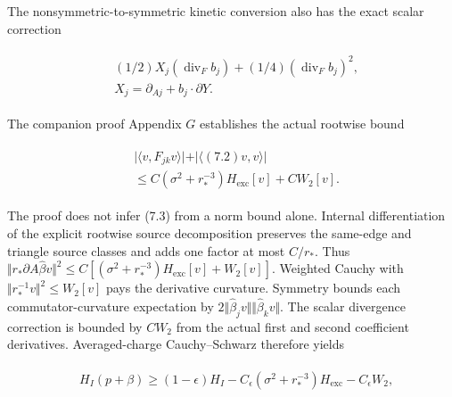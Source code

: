The nonsymmetric-to-symmetric kinetic conversion also has the exact
scalar correction

\begin{gather*}
\begin{aligned}
& (1/2)X_{j}(\operatorname{div} _{F} b_{j})+(1/4)(\operatorname{div} _{F} b_{j})^{2}, \\
& X_{j}= \partial  _{Aj}+b_{j} \cdot  \partial  Y.
\end{aligned}\tag{7.2}
\end{gather*}

The companion proof Appendix \(G\) establishes the actual rootwise bound

\begin{gather*}
\begin{aligned}
& \vert \langle v,F_{jk} v\rangle \vert +\vert \langle (7.2)v,v\rangle \vert \\
& \le C( \sigma ^{2}+r_{*}^{-3})H_{\mathrm{exc}}[v]+C W_{2}[v].
\end{aligned}\tag{7.3}
\end{gather*}

The proof does not infer (7.3) from a norm bound alone. Internal
differentiation of the explicit rootwise source decomposition preserves
the same-edge and triangle source classes and adds one factor at most
\(C/r_{*}\). Thus
\(\Vert r_{*} \partial  A \widehat{\beta} v\Vert ^{2}\le C[( \sigma ^{2}+r_{*}^{-3})H_{\mathrm{exc}}[v]+W_{2}[v]]\).
Weighted Cauchy with \(\Vert r_{*}^{-1}v\Vert ^{2}\le W_{2}[v]\) pays
the derivative curvature. Symmetry bounds each commutator-curvature
expectation by
\(2\Vert  \widehat{\beta}_{j} v\Vert \Vert  \widehat{\beta}_{k} v\Vert\).
The scalar divergence correction is bounded by \(CW_{2}\) from the
actual first and second coefficient derivatives. Averaged-charge
Cauchy--Schwarz therefore yields

\begin{gather*}
\begin{aligned}
& H_{I}(p+ \beta  )\ge (1- \epsilon  )H_{I}-C_{\epsilon} ( \sigma ^{2}+r_{*}^{-3})H_{\mathrm{exc}}-C_{\epsilon} W_{2},
\end{aligned}\tag{7.4}
\end{gather*}

